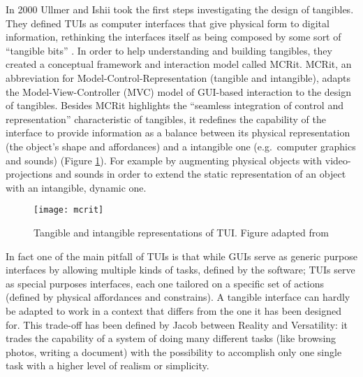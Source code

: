 In 2000 Ullmer and Ishii \autocite*{Ullmer:2000vf} took the first steps investigating the design of tangibles. They defined TUIs as computer interfaces that give physical form to digital information, rethinking the interfaces itself as being composed by some sort of ``tangible bits'' \autocite{Ishii:2008fh}. In order to help understanding and building tangibles, they created a conceptual framework and interaction model called MCRit. MCRit, an abbreviation for Model-Control-Representation (tangible and intangible), adapts the Model-View-Controller (MVC) model of GUI-based interaction to the design of tangibles. Besides MCRit highlights the ``seamless integration of control and representation'' characteristic of tangibles, it redefines the capability of the interface to provide information as a balance between its physical representation (the object's shape and affordances) and a intangible one (e.g.~computer graphics and sounds) (Figure \ref{fig:mcrit-model}). For example by augmenting physical objects with video-projections and sounds in order to extend the static representation of an object with an intangible, dynamic one.
\begin{figure}
	[tbh] \centering 
	\texttt{[image: mcrit]} \caption{Tangible and intangible representations of TUI. Figure adapted from \protect\autocite{Ishii:2008fh}} \label{fig:mcrit-model} 
\end{figure}

In fact one of the main pitfall of TUIs is that while GUIs serve as generic purpose interfaces by allowing multiple kinds of tasks, defined by the software; TUIs serve as special purposes interfaces, each one tailored on a specific set of actions (defined by physical affordances and constrains). A tangible interface can hardly be adapted to work in a context that differs from the one it has been designed for. This trade-off has been defined by Jacob \autocite*{Jacob:2008vm} between Reality and Versatility: it trades the capability of a system of doing many different tasks (like browsing photos, writing a document) with the possibility to accomplish only one single task with a higher level of realism or simplicity.

